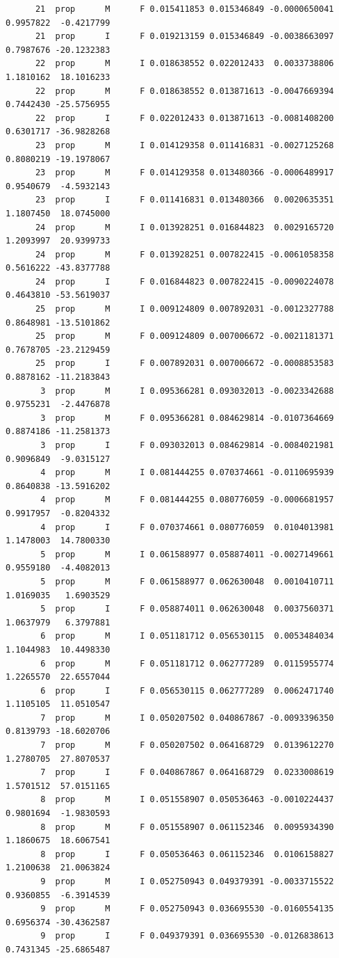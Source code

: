 \documentclass[
  landscape]{article}
\begin{document}
\begin{verbatim}
      21  prop      M      F 0.015411853 0.015346849 -0.0000650041 0.9957822  -0.4217799
      21  prop      I      F 0.019213159 0.015346849 -0.0038663097 0.7987676 -20.1232383
      22  prop      M      I 0.018638552 0.022012433  0.0033738806 1.1810162  18.1016233
      22  prop      M      F 0.018638552 0.013871613 -0.0047669394 0.7442430 -25.5756955
      22  prop      I      F 0.022012433 0.013871613 -0.0081408200 0.6301717 -36.9828268
      23  prop      M      I 0.014129358 0.011416831 -0.0027125268 0.8080219 -19.1978067
      23  prop      M      F 0.014129358 0.013480366 -0.0006489917 0.9540679  -4.5932143
      23  prop      I      F 0.011416831 0.013480366  0.0020635351 1.1807450  18.0745000
      24  prop      M      I 0.013928251 0.016844823  0.0029165720 1.2093997  20.9399733
      24  prop      M      F 0.013928251 0.007822415 -0.0061058358 0.5616222 -43.8377788
      24  prop      I      F 0.016844823 0.007822415 -0.0090224078 0.4643810 -53.5619037
      25  prop      M      I 0.009124809 0.007892031 -0.0012327788 0.8648981 -13.5101862
      25  prop      M      F 0.009124809 0.007006672 -0.0021181371 0.7678705 -23.2129459
      25  prop      I      F 0.007892031 0.007006672 -0.0008853583 0.8878162 -11.2183843
       3  prop      M      I 0.095366281 0.093032013 -0.0023342688 0.9755231  -2.4476878
       3  prop      M      F 0.095366281 0.084629814 -0.0107364669 0.8874186 -11.2581373
       3  prop      I      F 0.093032013 0.084629814 -0.0084021981 0.9096849  -9.0315127
       4  prop      M      I 0.081444255 0.070374661 -0.0110695939 0.8640838 -13.5916202
       4  prop      M      F 0.081444255 0.080776059 -0.0006681957 0.9917957  -0.8204332
       4  prop      I      F 0.070374661 0.080776059  0.0104013981 1.1478003  14.7800330
       5  prop      M      I 0.061588977 0.058874011 -0.0027149661 0.9559180  -4.4082013
       5  prop      M      F 0.061588977 0.062630048  0.0010410711 1.0169035   1.6903529
       5  prop      I      F 0.058874011 0.062630048  0.0037560371 1.0637979   6.3797881
       6  prop      M      I 0.051181712 0.056530115  0.0053484034 1.1044983  10.4498330
       6  prop      M      F 0.051181712 0.062777289  0.0115955774 1.2265570  22.6557044
       6  prop      I      F 0.056530115 0.062777289  0.0062471740 1.1105105  11.0510547
       7  prop      M      I 0.050207502 0.040867867 -0.0093396350 0.8139793 -18.6020706
       7  prop      M      F 0.050207502 0.064168729  0.0139612270 1.2780705  27.8070537
       7  prop      I      F 0.040867867 0.064168729  0.0233008619 1.5701512  57.0151165
       8  prop      M      I 0.051558907 0.050536463 -0.0010224437 0.9801694  -1.9830593
       8  prop      M      F 0.051558907 0.061152346  0.0095934390 1.1860675  18.6067541
       8  prop      I      F 0.050536463 0.061152346  0.0106158827 1.2100638  21.0063824
       9  prop      M      I 0.052750943 0.049379391 -0.0033715522 0.9360855  -6.3914539
       9  prop      M      F 0.052750943 0.036695530 -0.0160554135 0.6956374 -30.4362587
       9  prop      I      F 0.049379391 0.036695530 -0.0126838613 0.7431345 -25.6865487
\end{verbatim}
\end{document}
